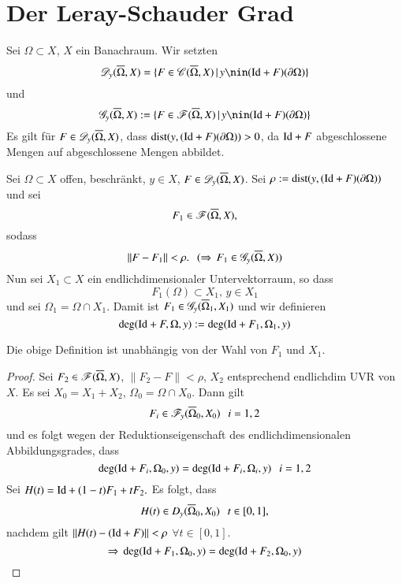 \section{Der Leray-Schauder Grad}

Sei $\Omega\subset X$, $X$ ein Banachraum. Wir setzten
\[
    \ms D_y(\ol \Omega,X)=\{ F\in \ms C(\ol\Omega,X)\, | \, y\nin(\Id + F)(\partial \Omega) \}
\]
und
\[
    \ms G_y(\ol\Omega,X):=\{F\in \ms F(\ol \Omega,X)\, |\, y\nin(\Id+F)(\partial\Omega)\}
\]
Es gilt für $F\in \mathscr D_y(\overline \Omega,X)$, dass $\mathrm{dist}(y,(\mathrm{Id}+F)(\partial\Omega))>0$, da $\mathrm{Id}+F$
abgeschlossene Mengen auf abgeschlossene Mengen abbildet.

\begin{defi}\label{3.8}
    Sei $\Omega\subset X$ offen, beschränkt, $y\in X$, $F\in \mathscr D_y(\overline \Omega,X)$. Sei $\rho:=
    \mathrm{dist}(y,(\mathrm{Id}+F)(\partial \Omega))$ und sei
    \[
        F_1\in \mathscr F(\overline \Omega, X),
    \]
    sodass
    \[
        \|F-F_1\|<\rho. \hspace{.25cm} (\Rightarrow \, F_1\in \mathscr G_y(\overline \Omega,X))
    \]
    Nun sei $X_1\subset X$ ein endlichdimensionaler Untervektorraum, so dass
    \[
        F_1(\Omega)\subset X_1,\, y\in X_1
    \] 
    und sei $\Omega_1=\Omega\cap X_1$. Damit ist $F_1\in \mathscr G_y(\overline\Omega_1,X_1)$ und wir definieren
    \[
        \deg(\mathrm{Id}+F,\Omega,y):=\deg(\mathrm{Id}+F_1,\Omega_1,y)
    \]
\end{defi}

\begin{prop}\label{3.9}
    Die obige Definition ist unabhängig von der Wahl von $F_1$ und $X_1$.
\end{prop}

\begin{proof}
    Sei $F_2\in \mathscr F (\overline \Omega,X)$, $\|F_2-F\|<\rho$, $X_2$ entsprechend endlichdim UVR von $X$. Es 
    sei $X_0=X_1+X_2$, $\Omega_0=\Omega\cap X_0$. Dann gilt
    \[
        F_i\in \mathscr F_y(\overline\Omega_0,X_0) \hspace{.25cm} i=1,2
    \]
    und es folgt wegen der Reduktionseigenschaft des endlichdimensionalen Abbildungsgrades, dass
    \[
        \deg(\mathrm{Id} + F_i,\Omega_0,y)=\deg(\mathrm{Id}+F_i,\Omega_i,y)\hspace{.25cm} i=1,2
    \]
    Sei $H(t)=\mathrm{Id} + (1-t)F_1+tF_2.$ Es folgt, dass
    \[
        H(t)\in D_y(\overline\Omega_0,X_0) \hspace{.25cm} t\in [0,1],
    \]
    nachdem gilt $\|H(t)-(\mathrm{Id}+F)\|<\rho$ $\forall t\in [0,1]$.
    \[
        \Rightarrow \, \deg(\mathrm{Id}+F_1,\Omega_0,y)=\deg(\mathrm{Id}+F_2,\Omega_0,y)
    \]
\end{proof}

